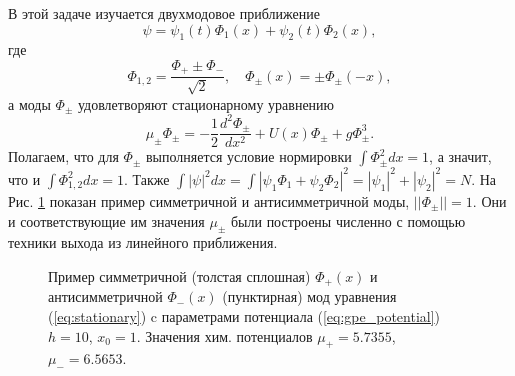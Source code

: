 \documentclass[12pt]{article}
\begin{document}
В этой задаче изучается двухмодовое приближение
%
\begin{equation}
\psi = \psi_1(t) \Phi_1(x) + \psi_2(t) \Phi_2(x),
\label{eq:two_modes}
\end{equation}
%
где
%
\begin{equation}
\Phi_{1,2} = \dfrac{\Phi_+ \pm \Phi_-}{\sqrt{2}}, \quad \Phi_{\pm}(x) = \pm \Phi_{\pm} (-x),
\label{eq:conditions}
\end{equation}
%
а моды $\Phi_{\pm}$ удовлетворяют стационарному уравнению
%
\begin{equation}
\mu_{\pm} \Phi_{\pm} = -\dfrac{1}{2} \dfrac{d^2 \Phi_{\pm}}{dx^2} + U(x) \Phi_{\pm} + g \Phi_{\pm}^3.
\label{eq:stationary}
\end{equation}
%
Полагаем, что для $\Phi_{\pm}$ выполняется условие нормировки $\int \Phi_{\pm}^2 dx = 1$, а значит, что и $\int \Phi_{1,2}^2 dx = 1$.
Также $\int |\psi|^2 dx = \int |\psi_1 \Phi_1 + \psi_2 \Phi_2|^2 = |\psi_1|^2 + |\psi_2|^2 = N$.
%
На Рис. \ref{pic:potential_and_modes} показан пример симметричной и антисимметричной моды, $|| \Phi_{\pm} || = 1$.
Они и соответствующие им значения $\mu_{\pm}$ были построены численно с помощью техники выхода из линейного приближения. 
%
\begin{figure}[Ht!]
\caption{Пример симметричной (толстая сплошная) $\Phi_+(x)$ и антисимметричной $\Phi_-(x)$ (пунктирная) мод уравнения (\ref{eq:stationary}) c параметрами потенциала (\ref{eq:gpe_potential}) $h = 10$, $x_0 = 1$. Значения хим. потенциалов $\mu_+ = 5.7355$, $\mu_- = 6.5653$.}
\label{pic:potential_and_modes}
\end{figure}
%
\end{document}
